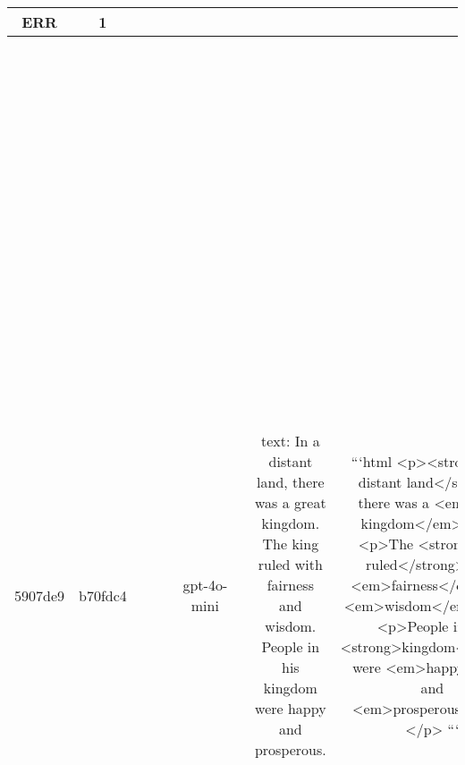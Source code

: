 \begin{table}[h!]
\begin{tabular}{|c|c|c|c|c|c|c|c|c|c|}
ERR & 1\\
\hline
5907de9 & b70fdc4 &  &  & gpt-4o-mini & text: In a distant land, there was a great kingdom. The king ruled with fairness and wisdom. People in his kingdom were happy and prosperous. & ```html
<p><strong>In a distant land</strong>, there was a <em>great kingdom</em>.</p>
<p>The <strong>king ruled</strong> with <em>fairness</em> and <em>wisdom</em>.</p>
<p>People in his <strong>kingdom</strong> were <em>happy</em> and <em>prosperous</em>.</p>
``` & ok & The chatbot output consists of three <p> tags, meeting the requirement to have at least three such tags. Each <p> tag contains one <strong> tag, which matches the guideline to include one <strong> tag within each <p> tag. Additionally, each <p> tag features multiple <em> tags, thus fulfilling the condition to have multiple <em> tags inside each paragraph. Based on the output, all specified requirements provided in the description that do not require knowing the input appear to be complied with. Therefore, there are no violations.

OK & 1\\
\hline
5907de9 & b70fdc4 &  &  & gemma2:9b & text: In a distant land, there was a great kingdom. The king ruled with fairness and wisdom. People in his kingdom were happy and prosperous. & <p><strong>In</strong> a **distant** <em>land</em>, <strong>there</strong> was a **great** <em>kingdom</em>.</p>

<p><strong>The</strong> <em>king</em> <strong>ruled</strong> with **fairness** and **wisdom**. </p> 

<p><strong>People</strong> in his <em>kingdom</em> were **happy** and **prosperous**. </p>  
 & ok & The output provided by the chatbot includes three sentences, each wrapped in a <p> tag, which satisfies the requirement of having at least three <p> tags. Additionally, each <p> tag contains at least one <strong> tag and multiple <em> tags to emphasize key words and phrases in the sentences. There is no indication that the provided rules are not being followed regarding the use of <strong> and <em> tags for emphasis.

Even though the text uses **bold** markers which are not standard HTML tags, this evaluation focuses only on whether the chatbot meets the description requirements, which include having <p>, <strong>, and <em> tags. Based on the constraints in the description and focusing on compliance rather than correctness of HTML usage beyond the scope of required tags, this output meets the prescribed criteria.


\end{tabular}
\end{table}
